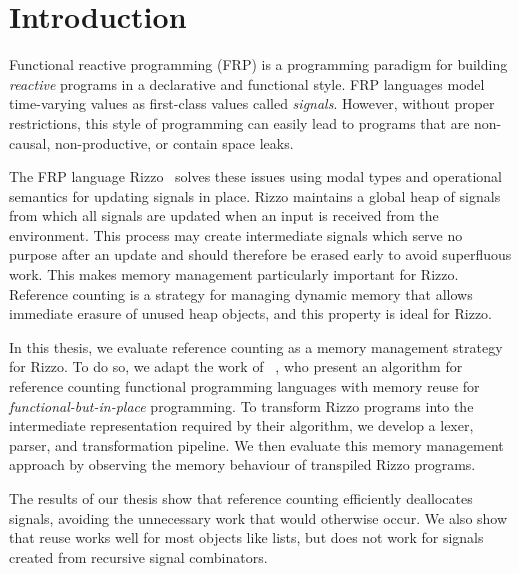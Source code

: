 
\section{Introduction}


Functional reactive programming (FRP) is a programming paradigm for building \textit{reactive} programs in a declarative and functional style. FRP languages model time-varying values as first-class values called \textit{signals}. 
However, without proper restrictions, this style of programming can easily lead to programs that are non-causal, non-productive, or contain space leaks.

The FRP language Rizzo~\cite{rizzo_modal_2025} solves these issues using modal types and operational semantics for updating signals in place.
Rizzo maintains a global heap of signals from which all signals are updated when an input is received from the environment.
This process may create intermediate signals which serve no purpose after an update and should therefore be erased early to avoid superfluous work. This makes memory management particularly important for Rizzo. 
Reference counting is a strategy for managing dynamic memory that allows immediate erasure of unused heap objects, and this property is ideal for Rizzo.

In this thesis, we evaluate reference counting as a memory management strategy for Rizzo. To do so, we adapt the work of \citeauthor*{ullrich_counting_2021}~\cite{ullrich_counting_2021}, who present an algorithm for reference counting functional programming languages with memory reuse for \textit{functional-but-in-place} programming. To transform Rizzo programs into the intermediate representation required by their algorithm, we develop a lexer, parser, and transformation pipeline. We then evaluate this memory management approach by observing the memory behaviour of transpiled Rizzo programs.

The results of our thesis show that reference counting efficiently deallocates signals, avoiding the unnecessary work that would otherwise occur. We also show that reuse works well for most objects like lists, but does not work for signals created from recursive signal combinators.

